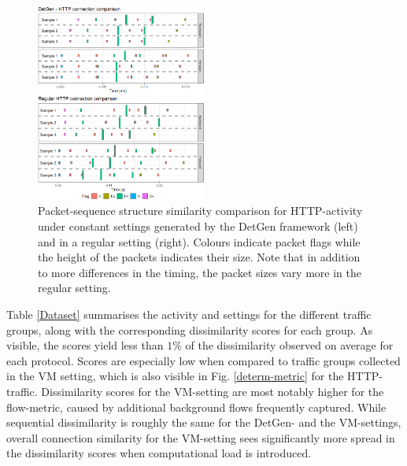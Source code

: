 \documentclass[sigconf]{acmart}
\begin{document}
\begin{figure}
\centering
\includegraphics[width=0.5\textwidth]{images/HTTP_comp_crop.png}
\caption{Packet-sequence structure similarity comparison for HTTP-activity under constant settings generated by the DetGen framework (left) and in a regular setting (right). Colours indicate packet flags while the height of the packets indicates their size. Note that in addition to more differences in the timing, the packet sizes vary more in the regular setting. }
\end{figure}

Table \ref{Dataset} summarises the activity and settings for the different traffic groups, along with the corresponding dissimilarity scores for each group. As visible, the scores yield less than $1\%$ of the dissimilarity observed on average for each protocol. Scores are especially low when compared to traffic groups collected in the VM setting, which is also visible in Fig. \ref{determ-metric} for the HTTP-traffic. Dissimilarity scores for the VM-setting are most notably higher for the flow-metric, caused by additional background flows frequently captured. While sequential dissimilarity is roughly the same for the DetGen- and the VM-settings, overall connection similarity for the VM-setting sees significantly more spread in the dissimilarity scores when computational load is introduced.


\end{document}
